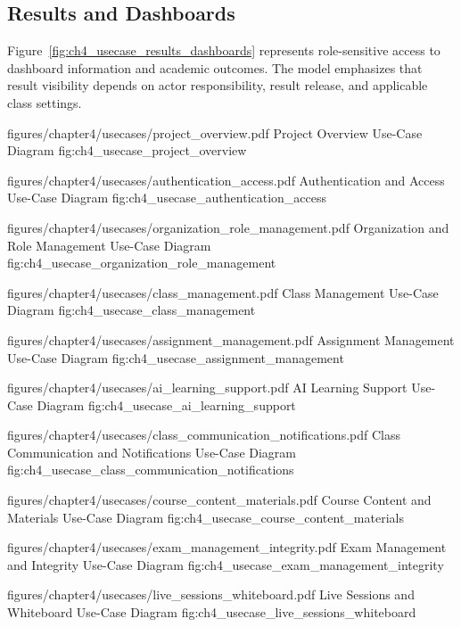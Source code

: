 \begin{samepage}
\subsection*{Results and Dashboards}

Figure~\ref{fig:ch4_usecase_results_dashboards} represents role-sensitive
access to dashboard information and academic outcomes. The model emphasizes
that result visibility depends on actor responsibility, result release, and
applicable class settings.
\end{samepage}

\clearpage

\EduUseCasePdfFigure
  {figures/chapter4/usecases/project_overview.pdf}
  {Project Overview Use-Case Diagram}
  {fig:ch4_usecase_project_overview}

\EduUseCasePdfFigure
  {figures/chapter4/usecases/authentication_access.pdf}
  {Authentication and Access Use-Case Diagram}
  {fig:ch4_usecase_authentication_access}

\EduUseCasePdfFigure
  {figures/chapter4/usecases/organization_role_management.pdf}
  {Organization and Role Management Use-Case Diagram}
  {fig:ch4_usecase_organization_role_management}

\EduUseCasePdfFigure
  {figures/chapter4/usecases/class_management.pdf}
  {Class Management Use-Case Diagram}
  {fig:ch4_usecase_class_management}

\EduUseCasePdfFigure
  {figures/chapter4/usecases/assignment_management.pdf}
  {Assignment Management Use-Case Diagram}
  {fig:ch4_usecase_assignment_management}

\EduUseCasePdfFigure
  {figures/chapter4/usecases/ai_learning_support.pdf}
  {AI Learning Support Use-Case Diagram}
  {fig:ch4_usecase_ai_learning_support}

\EduUseCasePdfFigure
  {figures/chapter4/usecases/class_communication_notifications.pdf}
  {Class Communication and Notifications Use-Case Diagram}
  {fig:ch4_usecase_class_communication_notifications}

\EduUseCasePdfFigure
  {figures/chapter4/usecases/course_content_materials.pdf}
  {Course Content and Materials Use-Case Diagram}
  {fig:ch4_usecase_course_content_materials}

\EduUseCasePdfFigure
  {figures/chapter4/usecases/exam_management_integrity.pdf}
  {Exam Management and Integrity Use-Case Diagram}
  {fig:ch4_usecase_exam_management_integrity}

\EduUseCasePdfFigure
  {figures/chapter4/usecases/live_sessions_whiteboard.pdf}
  {Live Sessions and Whiteboard Use-Case Diagram}
  {fig:ch4_usecase_live_sessions_whiteboard}

